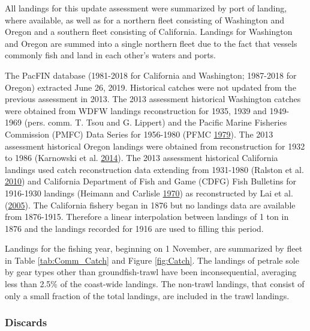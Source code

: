 \documentclass[12pt,]{article}
\begin{document}
All landings for this update assessment were summarized by port of
landing, where available, as well as for a northern fleet consisting of
Washington and Oregon and a southern fleet consisting of California.
Landings for Washington and Oregon are summed into a single northern
fleet due to the fact that vessels commonly fish and land in each
other's waters and ports.

The PacFIN database (1981-2018 for California and Washington; 1987-2018
for Oregon) extracted June 26, 2019. Historical catches were not updated
from the previous assessment in 2013. The 2013 assessment historical
Washington catches were obtained from WDFW landings reconstruction for
1935, 1939 and 1949- 1969 (pers. comm. T. Tsou and G. Lippert) and the
Pacific Marine Fisheries Commission (PMFC) Data Series for 1956-1980
(PFMC \protect\hyperlink{ref-pfmc_data_1979}{1979}). The 2013 assessment
historical Oregon landings were obtained from reconstruction for 1932 to
1986 (Karnowski et al.
\protect\hyperlink{ref-karnowski_historical_2014}{2014}). The 2013
assessment historical California landings used catch reconstruction data
extending from 1931-1980 (Ralston et al.
\protect\hyperlink{ref-ralston_documentation_2010}{2010}) and California
Department of Fish and Game (CDFG) Fish Bulletins for 1916-1930 landings
(Heimann and Carlisle
\protect\hyperlink{ref-heimann_pacific_1970}{1970}) as reconstructed by
Lai et al. (\protect\hyperlink{ref-lai_stock_2005}{2005}). The
California fishery began in 1876 but no landings data are available from
1876-1915. Therefore a linear interpolation between landings of 1 ton in
1876 and the landings recorded for 1916 are used to filling this period.

Landings for the fishing year, beginning on 1 November, are summarized
by fleet in Table \ref{tab:Comm_Catch} and Figure \ref{fig:Catch}. The
landings of petrale sole by gear types other than groundfish-trawl have
been inconsequential, averaging less than 2.5\% of the coast-wide
landings. The non-trawl landings, that consist of only a small fraction
of the total landings, are included in the trawl landings.

\subsubsection{Discards}\label{discards}
\end{document}
